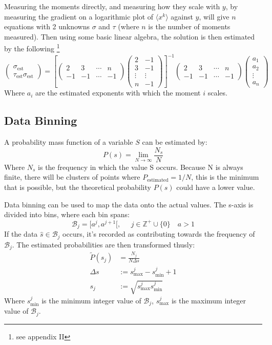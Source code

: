 \documentclass[twoside]{article}
\begin{document}
Measuring the moments directly, and measuring how they scale with $y$, by measuring the gradient on a logarithmic plot of $\langle x^k \rangle$ against $y$, will give $n$  equations with 2 unknowns $\sigma$ and $\tau$ (where $n$ is the number of moments measured). Then using some basic linear algebra, the solution is then estimated by the following
\footnote{see appendix II}
\[
\begin{pmatrix}
\sigma_{\text{est}} \\
\tau_{\text{est}} \sigma_{\text{est}}
\end{pmatrix} =
\left[
\begin{pmatrix}
2 & 3 & \cdots & n \\
-1 & -1 & \cdots & -1
\end{pmatrix}
\begin{pmatrix}
2 & -1 \\
3  & -1 \\
\vdots & \vdots \\
n & -1
\end{pmatrix}
\right]^{-1}
\begin{pmatrix}
2 & 3 & \cdots & n \\
-1 & -1 & \cdots & -1
\end{pmatrix}
\begin{pmatrix}
a_1 \\
a_2 \\
\vdots \\
a_n
\end{pmatrix}
\]
Where $a_i$ are the estimated exponents with which the moment $i$ scales.

\subsection{Data Binning}
A probability mass function of a variable $S$ can be estimated by:
\[
P(s) = \lim_{N \to \infty} \frac{N_s}{N}
\]
Where $N_s$ is the frequency in which the value S occurs. Because N is always finite, there will be clusters of points where $P_{\text{estimated}}=1/N$, this is the minimum that is possible, but the theoretical probability $P(s)$ could have a lower value.

Data binning can be used to map the data onto the actual values. The s-axis is divided into bins, where each bin spans: 
\[
\mathcal{B}_j =[a^j , a^{j+1} [, \;\;\;\;\; j \in \mathbb{Z}^+ \cup \{0\} \quad a>1
\]
If the data $\hat{s} \in \mathcal{B}_j $ occurs, it's recorded as contributing towards the frequency of $ \mathcal{B}_j $. The estimated probabilities are then transformed thusly:
\begin{align*}
\widetilde{P}(s_j) &= \frac{N_j}{N \Delta s} \\
\Delta s & := s_{\text{max}}^j - s_{\text{min}}^j +1 \\
s_j & := \sqrt{s_{\text{max}}^j s_{\text{min}}^j}
\end{align*}
Where $s_{\text{min}}^j$ is the minimum integer value of $\mathcal{B}_j $, $s_{\text{max}}^j$ is the maximum integer value of  $\mathcal{B}_j $. 
\end{document}

